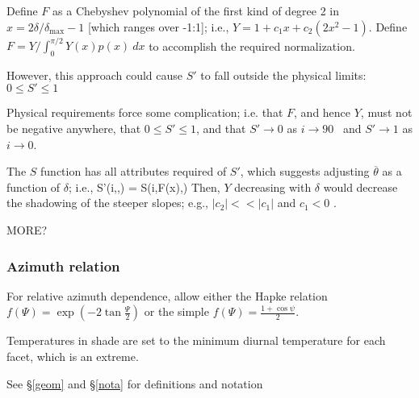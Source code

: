 \documentclass{article}
\begin{document}
Define $F$ as a Chebyshev polynomial of the first kind of degree 2 in
$x=2\delta/\delta_\mathrm{max} -1$ [which ranges over -1:1]; i.e.,
$Y=1+c_1x+c_2(2x^2-1)$. Define $F=Y/\int_0^{\pi/2} Y(x)p(x)\ dx $ to accomplish
the required normalization.

However, this approach could cause $S'$ to fall outside the physical limits: $ 0
\leq S' \leq 1$

Physical requirements force some complication; i.e. that $F$, and hence $Y$,
must not be negative anywhere, that $ 0 \leq S' \leq 1$, and that $S'
\rightarrow 0$ as $i \rightarrow 90$\qd~ and $S' \rightarrow 1$ as $i
\rightarrow 0$.

 The $S$ function has all attributes required of $S'$, which suggests adjusting
 $\overline{\theta}$ as a function of $\delta$; i.e., \qbn
 S'(i,\overline{\theta},\delta) = S(i,F(x)\overline{\theta},\delta) \qen Then,
 $Y$ decreasing with $\delta$ would decrease the shadowing of the steeper
 slopes; e.g., $|c_2| << |c_1| $ and $c_1 < 0$ .

MORE?

\subsubsection{Azimuth relation}  %

For relative azimuth dependence, allow either the Hapke relation $f(\Psi)=\exp
  \left( -2 \tan \frac{\Psi}{2} \right)$ or the simple  $f(\Psi)=\frac{1+ \cos \psi}{2}$.

Temperatures in shade are set to the minimum diurnal temperature for each facet, which is an extreme.

 See \S \ref{geom} and \S \ref{nota} for definitions and notation

 \pagebreak 
\end{document}
